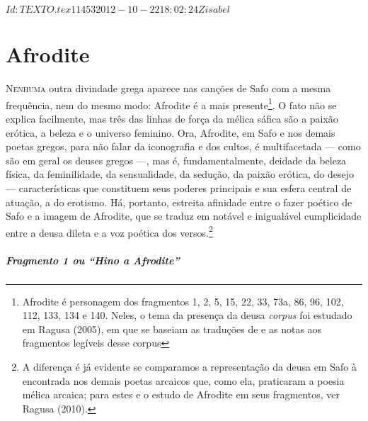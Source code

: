 \SVN $Id: TEXTO.tex 11453 2012-10-22 18:02:24Z isabel $

\pagestyle{plain}



\chapter{Afrodite}

\textsc{Nenhuma} outra divindade grega aparece nas canções de Safo com a mesma
frequência, nem do mesmo modo: Afrodite é a mais presente\footnote{ Afrodite é
personagem dos fragmentos 1, 2, 5, 15, 22, 33, 73a, 86, 96, 102, 112, 133, 134
e 140. Neles, o tema da presença da deusa \textit{corpus} foi estudado em Ragusa (2005), em que se baseiam as traduções de e as notas aos fragmentos legíveis desse corpus}. O fato
não se explica facilmente, mas três das linhas de força da mélica sáfica são a
paixão erótica, a beleza e o universo feminino. Ora, Afrodite, em Safo e nos
demais poetas gregos, para não falar da iconografia e dos cultos, é
multifacetada --- como são em geral os deuses gregos ---, mas é, fundamentalmente,
deidade da beleza física, da feminilidade, da sensualidade, da sedução, da
paixão erótica, do desejo --- características que constituem seus poderes
principais e sua esfera central de atuação, a do erotismo. Há, portanto,
estreita afinidade entre o fazer poético de Safo e a imagem de Afrodite, que se
traduz em notável e inigualável cumplicidade entre a deusa dileta e a voz
poética dos versos.\footnote{ A diferença é já evidente se comparamos a
representação da deusa em Safo à encontrada nos demais poetas arcaicos que, como ela, praticaram a poesia mélica arcaica; para estes e o estudo de Afrodite em seus fragmentos, ver Ragusa (2010).}

\paragraph{Fragmento 1 ou “Hino a Afrodite”}

